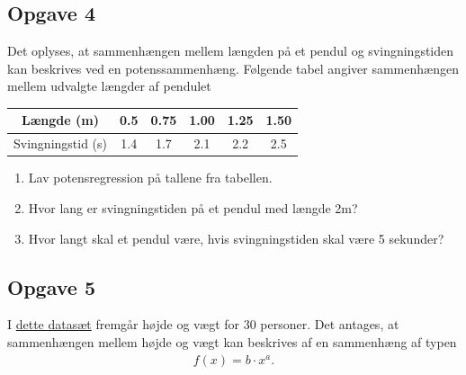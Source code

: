 \begin{center}
\end{center}



\subsection*{Opgave 4}

Det oplyses, at sammenhængen mellem længden på et pendul og svingningstiden kan beskrives ved en potenssammenhæng. Følgende tabel angiver sammenhængen mellem udvalgte længder af pendulet

\begin{center}\begin{tabular}{c|c|c|c|c|c}
Længde (m)& 0.5 & 0.75 & 1.00 & 1.25 & 1.50\\ \hline
Svingningstid (s) & 1.4 & 1.7 & 2.1 & 2.2 & 2.5 
\end{tabular}
\end{center}

\begin{enumerate}[label=\roman*)]
	\item Lav potensregression på tallene fra tabellen. 
	\item Hvor lang er svingningstiden på et pendul med længde 2m?
	\item Hvor langt skal et pendul være, hvis svingningstiden skal være 5 sekunder?
\end{enumerate}


\subsection*{Opgave 5}
I \href{https://github.com/ChristianJLex/TeachingNotes/raw/master/2023-2024/Data%20og%20lign/H%C3%B8jdeV%C3%A6gt.xlsx}{\color{blue!60} dette datasæt} fremgår højde og vægt for 30 personer. Det antages, at sammenhængen mellem højde og vægt kan beskrives af en sammenhæng af typen
\begin{align*}
	f(x) = b \cdot x^a.
\end{align*}

